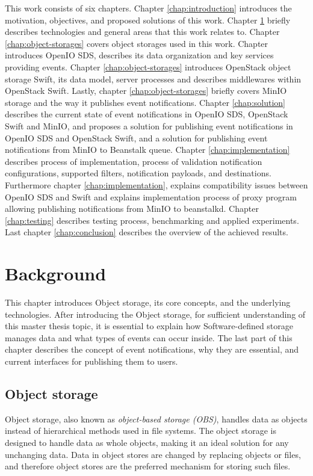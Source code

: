 This work consists of six chapters. Chapter \ref{chap:introduction} introduces the motivation, objectives, and proposed solutions of this work. Chapter \ref{chap:background} briefly describes technologies and general areas that this work relates to. Chapter \ref{chap:object-storages} covers object storages used in this work. Chapter introduces OpenIO SDS, describes its data organization and key services providing events. Chapter \ref{chap:object-storages} introduces OpenStack object storage Swift, its data model, server processes and describes middlewares within OpenStack Swift. Lastly, chapter \ref{chap:object-storages} briefly covers MinIO storage and the way it publishes event notifications. Chapter \ref{chap:solution} describes the current state of event notifications in OpenIO SDS, OpenStack Swift and MinIO, and proposes a solution for publishing event notifications in OpenIO SDS and OpenStack Swift, and a solution for publishing event notifications from MinIO to Beanstalk queue. Chapter \ref{chap:implementation} describes process of implementation, process of validation notification configurations, supported filters, notification payloads, and destinations. Furthermore chapter \ref{chap:implementation}, explains compatibility issues between OpenIO SDS and Swift and explains implementation process of proxy program allowing publishing notifications from MinIO to beanstalkd. Chapter \ref{chap:testing} describes testing process, benchmarking and applied experiments. Last chapter \ref{chap:conclusion} describes the overview of the achieved results.


\chapter{Background}\label{chap:background}

    This chapter introduces Object storage, its core concepts, and the underlying technologies. After introducing the Object storage, for sufficient understanding of this master thesis topic, it is essential to explain how Software-defined storage manages data and what types of events can occur inside. The last part of this chapter describes the concept of event notifications, why they are essential, and current interfaces for publishing them to users.

\section{Object storage}
    Object storage, also known as \textit{object-based storage (OBS)}, handles data as objects instead of hierarchical methods used in file systems\cite{objectBasedStorage}. The object storage is designed to handle data as whole objects, making it an ideal solution for any unchanging data. Data in object stores are changed by replacing objects or files, and therefore object stores are the preferred mechanism for storing such files\cite{networkStorage}.

